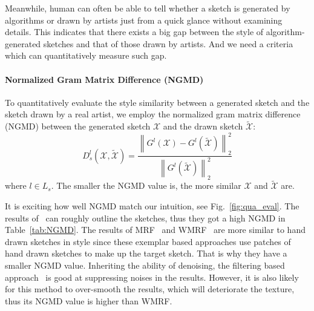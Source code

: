 \documentclass[10pt,twocolumn,letterpaper]{article}
\begin{document}
Meanwhile, human can often be able to tell whether a sketch is generated by algorithms or drawn by artists just from a quick glance without examining details.
This indicates that there exists a big gap between the style of algorithm-generated sketches and that of those drawn by artists. And we need a criteria which can quantitatively measure such gap.

\paragraph*{Normalized Gram Matrix Difference (NGMD)} To quantitatively evaluate the style similarity between a generated sketch and the sketch drawn by a real artist, we employ the normalized gram matrix difference (NGMD) between the generated sketch $\mathcal{X}$ and the drawn sketch ${\tilde {\mathcal{X}}}$:
\begin{equation}
{D^l_s}\left( {\mathcal{X},\tilde {\mathcal{X}}} \right) = \frac{{\left\| {{G^l}\left( \mathcal{X} \right) - {G^l}\left( {\tilde {\mathcal{X}}} \right)} \right\|_2^2}}{{\left\| {{G^l}\left( {\tilde {\mathcal{X}}} \right)} \right\|_2^2}}
\label{eq:style_exp}
\end{equation}
where $l\in L_s$. The smaller the NGMD value is, the more similar $\mathcal{X}$ and ${\tilde {\mathcal{X}}}$ are. 

It is exciting how well NGMD match our intuition, see Fig.~\ref{fig:qua_eval}. 
The results of~\cite{zhang2015end} can roughly outline the sketches, thus they got a high NGMD in Table~\ref{tab:NGMD}. The results of MRF~\cite{wang2009face} and WMRF~\cite{zhou2012markov} are more similar to hand drawn sketches in style since these exemplar based approaches use patches of hand drawn sketches to make up the target sketch. That is why they have a smaller NGMD value. Inheriting the ability of denoising, the filtering based approach~\cite{song2014real} is good at suppressing noises in the results. However, it is also likely for this method to over-smooth the results, which will deteriorate the texture, thus its NGMD value is higher than WMRF. 
\end{document}
